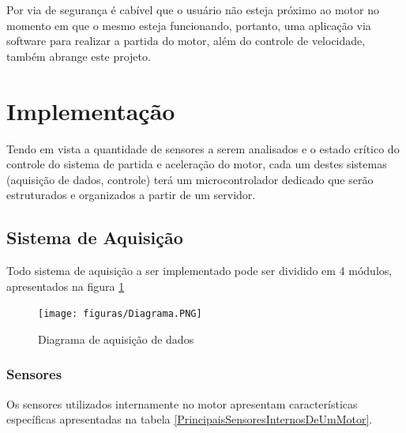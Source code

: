 Por via de segurança é cabível que o usuário não esteja próximo ao motor no momento em que o mesmo esteja funcionando, portanto, uma aplicação via software para realizar a partida do motor, além do controle de velocidade, também abrange este projeto.

\section{Implementação}

Tendo em vista a quantidade de sensores a serem analisados e o estado crítico do controle do sistema de partida e aceleração do motor, cada um destes sistemas (aquisição de dados, controle) terá um microcontrolador dedicado que serão estruturados e organizados a partir de um servidor.

\subsection{Sistema de Aquisição}

Todo sistema de aquisição a ser implementado pode ser dividido em 4 módulos, apresentados na figura \ref{diagramaDeAquisicaoDeDados}

\begin{figure}[h!]
	\centering
	\texttt{[image: figuras/Diagrama.PNG]}
	\caption{Diagrama de aquisição de dados}
	\label{diagramaDeAquisicaoDeDados}
\end{figure}

\subsubsection{Sensores}

Os sensores utilizados internamente no motor apresentam características específicas apresentadas na tabela \ref{PrincipaisSensoresInternosDeUmMotor}.

